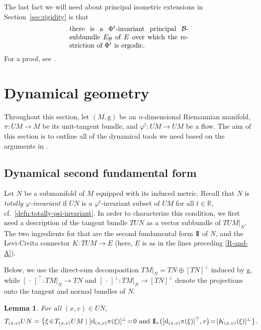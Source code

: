 \documentclass[10pt,a4paper]{amsart}
\newcommand{\g}{\mathrm{g}}
\numberwithin{equation}{section}
\newtheorem{Lemma}[Theorem]{Lemma}
\theoremstyle{definition}
\begin{document}
The last fact we will need about principal isometric extensions in Section~\ref{sec:rigidity} is that
\begin{equation}\label{ergodic-component}
 \parbox{.5\textwidth}{there is a $\Phi^t$-invariant principal $\mathcal{B}$-subbundle $E_{\mathcal{B}}$ of $E$ over which the restriction of $\Phi^t$ is ergodic.}
\end{equation}For a proof, see \cite[Proposition 3.2]{cekic2024ergodicity}.

\section{Dynamical geometry} \label{sec:dynamical-geometry}

Throughout this section, let $(M,\g)$ be an $n$-dimensional Riemannian manifold, \mbox{$\pi\colon UM\to M$} be its unit-tangent bundle, and $\varphi^t\colon UM \to UM$ be a flow. The aim of this section is to outline all of the dynamical tools we need based on the arguments in \cite{filip2024finiteness}.

\subsection{Dynamical second fundamental form}
Let $N$ be a submanifold of $M$ equipped with its induced metric. Recall that $N$ is \emph{totally \mbox{$\varphi$-invariant}} if $UN$ is a $\varphi^t$-invariant subset of $UM$ for all $t \in \mathbb{R}$, cf.\ \eqref{defn:totally-psi-invariant}. In order to characterize this condition, we first need a description of the tangent bundle $TUN$ as a vector subbundle of $TUM|_N$. The two ingredients for that are the second fundamental form ${\rm I\!I}$ of $N$, and the Levi-Civita connector $K\colon TUM \to E$ (here, $E$ is as in the lines preceding \eqref{R-and-A}).

Below, we use the direct-sum decomposition $TM|_N = TN\oplus [TN]^\perp$ induced by $\g$, while $[\,\cdot\,]^\top\colon TM|_N\to TN$ and $[\,\cdot\,]^\perp\colon TM|_N \to [TN]^\perp$ denote the projections onto the tangent and normal bundles of $N$.

\begin{Lemma}\label{lem:characterization}
 For all $(x,v) \in UN$,
 \begin{gather} \label{TUN-description} T_{(x,v)}UN
 = \bigl\{ \xi\! \in\! T_{(x,v)}UM \mid [{\rm d}_{(x,v)}\pi(\xi)]^\perp\! =\! 0  \ \text{and} \  {\rm I\!I}_x\bigl([{\rm d}_{(x,v)}\pi(\xi)]^\top, v\bigr)\!=\! [K_{(x,v)}(\xi)]^\perp \bigr\}.\!\!\!
 \end{gather}
\end{Lemma}
\end{document}
